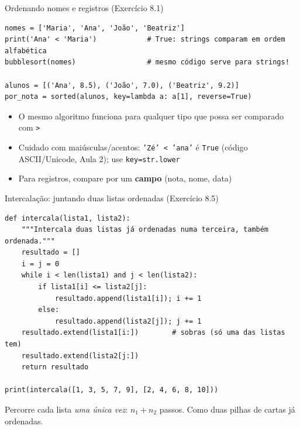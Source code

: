 \documentclass[aspectratio=169,10pt,t]{beamer}
\begin{document}
\begin{frame}[fragile]{Ordenando nomes e registros (Exercício 8.1)}
\begin{lstlisting}
nomes = ['Maria', 'Ana', 'João', 'Beatriz']
print('Ana' < 'Maria')            # True: strings comparam em ordem alfabética
bubblesort(nomes)                 # mesmo código serve para strings!

alunos = [('Ana', 8.5), ('João', 7.0), ('Beatriz', 9.2)]
por_nota = sorted(alunos, key=lambda a: a[1], reverse=True)
\end{lstlisting}
  \begin{itemize}
    \item O mesmo algoritmo funciona para qualquer tipo que possa ser comparado com \texttt{>}
    \item Cuidado com maiúsculas/acentos: \texttt{'Zé' < 'ana'} é \texttt{True} (código ASCII/Unicode, Aula 2); use \texttt{key=str.lower}
    \item Para registros, compare por um \textbf{campo} (nota, nome, data)
  \end{itemize}
\end{frame}

\begin{frame}[fragile]{Intercalação: juntando duas listas ordenadas (Exercício 8.5)}
\begin{lstlisting}
def intercala(lista1, lista2):
    """Intercala duas listas já ordenadas numa terceira, também ordenada."""
    resultado = []
    i = j = 0
    while i < len(lista1) and j < len(lista2):
        if lista1[i] <= lista2[j]:
            resultado.append(lista1[i]); i += 1
        else:
            resultado.append(lista2[j]); j += 1
    resultado.extend(lista1[i:])        # sobras (só uma das listas tem)
    resultado.extend(lista2[j:])
    return resultado

print(intercala([1, 3, 5, 7, 9], [2, 4, 6, 8, 10]))
\end{lstlisting}
  \small Percorre cada lista \emph{uma única vez}: \(n_1+n_2\) passos. Como duas pilhas de cartas já ordenadas.
\end{frame}
\end{document}
